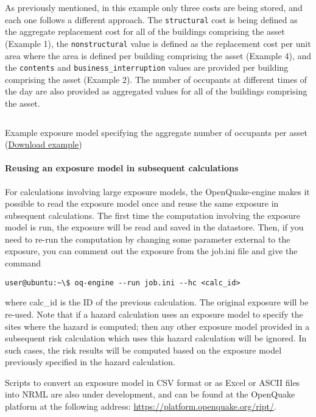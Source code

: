 As previously mentioned, in this example only three costs are being stored,
and each one follows a different approach. The \Verb+structural+ cost is being
defined as the aggregate replacement cost for all of the buildings comprising
the asset (Example 1), the \Verb+nonstructural+ value is defined as the
replacement cost per unit area where the area is defined per building
comprising the asset (Example 4), and the \Verb+contents+ and
\Verb+business_interruption+ values are provided per building comprising the
asset (Example 2). The number of occupants at different times of the day are
also provided as aggregated values for all of the buildings comprising the
asset.

\begin{listing}[htbp]
  \inputminted[firstline=1,firstnumber=1,fontsize=\footnotesize,frame=single,linenos,bgcolor=lightgray]{xml}{oqum/risk/Verbatim/input_exposure_occupants.xml}
  \caption{Example exposure model specifying the aggregate number of occupants per asset (\href{https://raw.githubusercontent.com/GEMScienceTools/oq-engine-docs/master/oqum/risk/verbatim/input_exposure_occupants.xml}{Download example})}
  \label{lst:input_exposure_occupants}
\end{listing}


\paragraph{Reusing an exposure model in subsequent calculations}

For calculations involving large exposure models, the OpenQuake-engine makes
it possible to read the exposure model once and reuse the same exposure in
subsequent calculations. The first time the computation involving the exposure
model is run, the exposure will be read and saved in the datastore. Then, if
you need to re-run the computation by changing some parameter external to the
exposure, you can comment out the exposure from the job.ini file and give the
command

\begin{verbatim}
user@ubuntu:~\$ oq-engine --run job.ini --hc <calc_id>
\end{verbatim}

where calc\_id is the ID of the previous calculation. The original exposure will
be re-used. Note that if a hazard calculation uses an exposure model to specify
the sites where the hazard is computed; then any other exposure model provided
in a subsequent risk calculation which uses this hazard calculation will be 
ignored. In such cases, the risk results will be computed based on the exposure
model previously specified in the hazard calculation.



Scripts to convert an \gls{exposure model} in CSV format or as Excel or
ASCII files into NRML are also under development, and can be found at the
OpenQuake platform at the following address:
\href{https://platform.openquake.org/ript/}{https://platform.openquake.org/ript/}.
